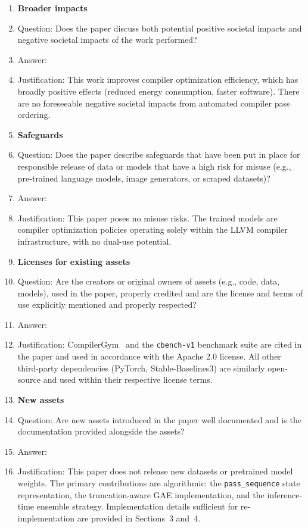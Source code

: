 \begin{enumerate}
\item {\bf Broader impacts}
    \item[] Question: Does the paper discuss both potential positive societal impacts and negative societal impacts of the work performed?
    \item[] Answer: \answerNA{}
    \item[] Justification: This work improves compiler optimization efficiency, which has broadly positive effects (reduced energy consumption, faster software). There are no foreseeable negative societal impacts from automated compiler pass ordering.

\item {\bf Safeguards}
    \item[] Question: Does the paper describe safeguards that have been put in place for responsible release of data or models that have a high risk for misuse (e.g., pre-trained language models, image generators, or scraped datasets)?
    \item[] Answer: \answerNA{}
    \item[] Justification: This paper poses no misuse risks. The trained models are compiler optimization policies operating solely within the LLVM compiler infrastructure, with no dual-use potential.

\item {\bf Licenses for existing assets}
    \item[] Question: Are the creators or original owners of assets (e.g., code, data, models), used in the paper, properly credited and are the license and terms of use explicitly mentioned and properly respected?
    \item[] Answer: \answerYes{}
    \item[] Justification: CompilerGym~\cite{CompilerGym} and the \texttt{cbench-v1} benchmark suite are cited in the paper and used in accordance with the Apache 2.0 license. All other third-party dependencies (PyTorch, Stable-Baselines3) are similarly open-source and used within their respective license terms.

\item {\bf New assets}
    \item[] Question: Are new assets introduced in the paper well documented and is the documentation provided alongside the assets?
    \item[] Answer: \answerNA{}
    \item[] Justification: This paper does not release new datasets or pretrained model weights. The primary contributions are algorithmic: the \texttt{pass\_sequence} state representation, the truncation-aware GAE implementation, and the inference-time ensemble strategy. Implementation details sufficient for re-implementation are provided in Sections~3 and~4.


\end{enumerate}
